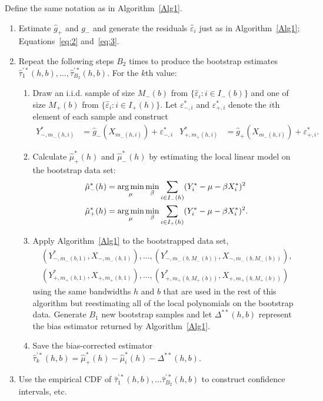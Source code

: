 \documentclass[12pt,fleqn]{article}
\begin{document}
\begin{algorithm}\label{Alg2}
  Define the same notation as in Algorithm~\ref{Alg1}.
  \begin{enumerate}
  \item Estimate $\hat g_+$ and $g_-$ and generate the residuals
    $\hat\varepsilon_i$ just as in Algorithm~\ref{Alg1}; Equations~\eqref{eq:2}
    and~\eqref{eq:3}.
  \item Repeat the following steps $B_{2}$ times to produce the
    bootstrap estimates
    $\hat\tau_1^{\prime*}(h,b), \dots, \hat\tau_{B_{2}}^{\prime*}(h,b)$. For the
    $k$th value:
    \begin{enumerate}
    \item Draw an i.i.d. sample of size $M_-(b)$ from
      $\{\hat\varepsilon_i : i \in I_-(b)\}$ and one of size $M_+(b)$ from
      $\{\hat\varepsilon_i : i \in I_+(h)\}$. Let $\varepsilon_{-,i}^{*}$ and
      $\varepsilon_{+,i}^{*}$ denote the $i$th element of each sample and
      construct
      \begin{align*}
        Y_{-,m_-(h,i)}^* &= \hat g_-(X_{m_-(h,i)}) + \varepsilon_{-,i}^{*} &
        Y_{+,m_+(h,i)}^* &= \hat g_+(X_{m_-(h,i)}) + \varepsilon_{+,i}^{*}.
      \end{align*}
    \item Calculate $\hat\mu_+^*(h)$ and $\hat\mu_-^*(h)$ by estimating the
      local linear model on the bootstrap data set:
      \begin{align*}
        \hat\mu_-^*(h)
        &= \argmin_{\mu} \min_{\beta} \ssum[-]{i}{h}
          (Y_i^* - \mu - \beta X_i^*)^2 \\
        \hat\mu_+^*(h)
        &= \argmin_{\mu} \min_{\beta} \ssum[+]{i}{h}
          (Y_i^* - \mu - \beta X_i^*)^2.
      \end{align*}
    \item Apply Algorithm~\ref{Alg1} to the bootstrapped data set,
      \begin{multline*}
        (Y_{-,m_-(b,1)}^{*}, X_{-,m_-(b,1)}),\dots,
        (Y_{-,m_-(b,M_-(b))}^{*},X_{-,m_-(b,M_-(b))}), \\
        (Y_{+,m_+(b,1)}^{*}, X_{+,m_+(b,1)}),\dots,
        (Y_{+,m_+(b,M_+(b))}^{*},X_{+,m_+(b,M_+(b))})
      \end{multline*}
      using the same bandwidths $h$ and $b$ that are used in the rest of this
      algorithm but reestimating all of the local polynomials on the bootstrap
      data. Generate $B_1$ new bootstrap samples and let $\Delta^{**}(h,b)$
      represent the bias estimator returned by Algorithm~\ref{Alg1}.
    \item Save the bias-corrected estimator
      $\hat\tau_k^{\prime*}(h,b) = \hat\mu_+^*(h) - \hat\mu_i^*(h)
      - \Delta^{**}(h,b)$.
    \end{enumerate}
  \item Use the empirical CDF of
    $\hat\tau_1^{\prime*}(h,b),\dots \hat\tau_{B_2}^{\prime*}(h,b)$ to
    construct confidence intervals, etc.
  \end{enumerate}
\end{algorithm}
\end{document}
